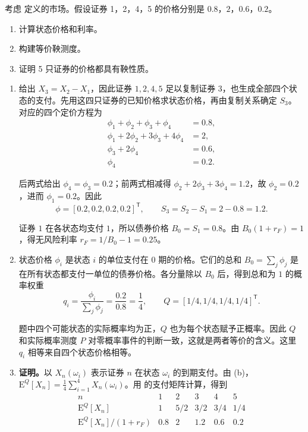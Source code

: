 \begin{problem}
 考虑 定义的市场。假设证券 1，2，4，5 的价格分别是 $0.8$，$2$，$0.6$，$0.2$。
\begin{enumerate}[label=(\alph*)]
    \item 计算状态价格和利率。
    \item 构建等价鞅测度。
    \item 证明 5 只证券的价格都具有鞅性质。
\end{enumerate}
\end{problem}
\begin{solution}[blank-type=manual,blank-vsep=9\baselineskip]
\begin{enumerate}[label=(\alph*)]
    \item {} 给出 $X_3=X_2-X_1$，因此证券 $1,2,4,5$ 足以复制证券 $3$，也生成全部四个状态的支付。先用这四只证券的已知价格求状态价格，再由复制关系确定 $S_3$。对应的四个定价方程为
    \[
      \begin{aligned}
       \phi_1+\phi_2+\phi_3+\phi_4&=0.8,\\
       \phi_1+2\phi_2+3\phi_3+4\phi_4&=2,\\
       \phi_3+2\phi_4&=0.6,\\
       \phi_4&=0.2.
      \end{aligned}
    \]

    后两式给出 $\phi_4=\phi_3=0.2$；前两式相减得 $\phi_2+2\phi_3+3\phi_4=1.2$，故 $\phi_2=0.2$，进而 $\phi_1=0.2$。因此
    \[
       \phi=[0.2,0.2,0.2,0.2]^{\mathsf T},\qquad
       S_3=S_2-S_1=2-0.8=1.2.
    \]

    证券 $1$ 在各状态均支付 $1$，所以债券价格 $B_0=S_1=0.8$。由 $B_0(1+r_F)=1$，得无风险利率 $r_F=1/B_0-1=0.25$。

    \item 状态价格 $\phi_i$ 是状态 $i$ 的单位支付在 0 期的价格。它们的总和 $B_0=\sum_j\phi_j$ 是在所有状态都支付一单位的债券价格。各分量除以 $B_0$ 后，得到总和为 $1$ 的概率权重
    \[
       q_i=\frac{\phi_i}{\sum_j\phi_j}=\frac{0.2}{0.8}=\frac14,\qquad
       Q=[1/4,1/4,1/4,1/4]^{\mathsf T}.
    \]

    题中四个可能状态的实际概率均为正，$Q$ 也为每个状态赋予正概率。因此 $Q$ 和实际概率测度 $P$ 对零概率事件的判断一致，这就是两者等价的含义。这里 $q_i$ 相等来自四个状态价格相等。

    \item \textbf{证明。}以 $X_n(\omega_i)$ 表示证券 $n$ 在状态 $\omega_i$ 的到期支付。由 (b)，$\mathrm E^Q[X_n]=\tfrac14\sum_{i=1}^4 X_n(\omega_i)$。用 的支付矩阵计算，得到
    \[
      \begin{array}{c|ccccc}
       n&1&2&3&4&5\\\hline
       \mathrm E^Q[X_n]&1&5/2&3/2&3/4&1/4\\
       \mathrm E^Q[X_n]/(1+r_F)&0.8&2&1.2&0.6&0.2
      \end{array}
    \]


\end{enumerate}
\end{solution}
